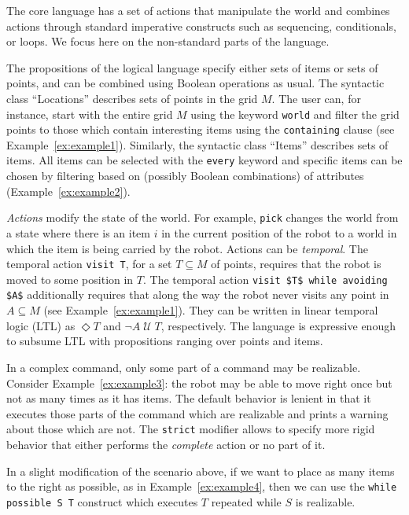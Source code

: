 \documentclass[letterpaper, 10 pt, conference]{ieeeconf}  %
\newcommand{\until}[2]{#1\; \mathcal{U}\; #2}
\begin{document}
The core language has a set of actions that manipulate the world and combines
actions through standard imperative constructs such as sequencing, conditionals, or loops.
We focus here on the non-standard parts of the language.

The propositions of the logical language specify either sets of items or sets of
points, and can be combined using Boolean operations as usual.
The syntactic class ``Locations'' describes sets of points in the grid $M$.
The user can, for instance, start with the entire grid $M$ using
the keyword \lstinline{world} and filter the grid points to those which
contain interesting items using the \lstinline{containing} clause
(see Example~\ref{ex:example1}).
Similarly, the syntactic class ``Items'' describes sets of items.
All items can be selected with the \lstinline{every} keyword and specific items can be chosen
by filtering based on (possibly Boolean combinations) of attributes
(Example~\ref{ex:example2}).

\emph{Actions} modify the state of the world. For example, \lstinline{pick} changes the
world from a state where there is an item $i$ in the current position of the
robot to a world in which the item is being carried by the robot.
Actions can be \emph{temporal}.
The temporal action \lstinline{visit T}, for a set $T\subseteq M$ of points,
requires that the robot is moved to some position in $T$.
The temporal action \lstinline{visit $T$ while avoiding $A$} additionally requires
that along the way the robot never visits any point in $A\subseteq M$
(see Example~\ref{ex:example1}).
They can be written in linear temporal logic (LTL) as $\Diamond T$ and $\until{\lnot A}{T}$,
respectively.
The language is expressive enough to subsume LTL with propositions ranging over points and
items.


In a complex command, only some part of a command may be realizable.
Consider Example~\ref{ex:example3}: the robot
may be able to move right once but not as many times as it has items.
The default behavior is lenient in that it executes those parts of the command
which are realizable and prints a warning about those which are not.
The \lstinline{strict} modifier allows to specify more rigid behavior that
either performs the \emph{complete} action or no part of it.

In a slight modification of the scenario above, if we want to place as many
items to the right as possible, as in Example~\ref{ex:example4}, then we can use
the \lstinline{while possible S T} construct which executes $T$ repeated while
$S$ is realizable.
\end{document}
